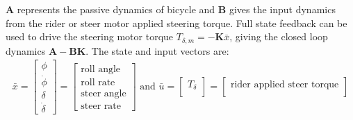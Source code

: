 \documentclass{icsc}
\begin{document}
\(\mathbf{A}\) represents the passive dynamics of bicycle and \(\mathbf{B}\)
gives the input dynamics from the rider or steer motor applied steering torque.
Full state feedback can be used to drive the steering motor torque
\(T_{\delta,m}=-\mathbf{K}\bar{x}\), giving the closed loop dynamics
\(\mathbf{A} - \mathbf{B} \mathbf{K}\). The state and input vectors are:
%
\begin{align}
  \bar{x} =
    \begin{bmatrix}
      \phi \\
      \dot{\phi} \\
      \delta \\
      \dot{\delta}
    \end{bmatrix} =
    \begin{bmatrix}
      \textrm{roll angle} \\
      \textrm{roll rate} \\
      \textrm{steer angle} \\
      \textrm{steer rate}
    \end{bmatrix}
  \textrm{ and }
  \bar{u} =
    \begin{bmatrix}
      T_{\delta} \\
    \end{bmatrix} =
    \begin{bmatrix}
      \textrm{rider applied steer torque} \\
    \end{bmatrix}
\end{align}
%
\end{document}
